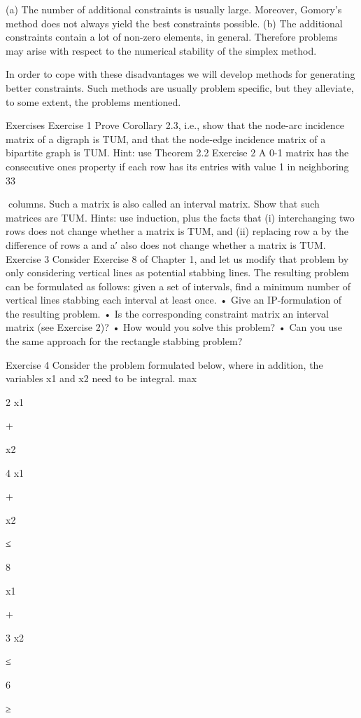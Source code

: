 \documentclass[titlepage]{book}
\theoremstyle{definition}
\begin{document}
(a) The number of additional constraints is usually large. Moreover, Gomory's method does not always
yield the best constraints possible.
(b) The additional constraints contain a lot of non-zero elements, in general. Therefore problems may
arise with respect to the numerical stability of the simplex method.

In order to cope with these disadvantages we will develop methods for generating better constraints. Such
methods are usually problem specific, but they alleviate, to some extent, the problems mentioned.

Exercises
Exercise 1
Prove Corollary 2.3, i.e., show that the node-arc incidence matrix of a digraph is TUM, and that the
node-edge incidence matrix of a bipartite graph is TUM. Hint: use Theorem 2.2
Exercise 2
A 0-1 matrix has the consecutive ones property if each row has its entries with value 1 in neighboring
33

columns. Such a matrix is also called an interval matrix. Show that such matrices are TUM. Hints: use
induction, plus the facts that (i) interchanging two rows does not change whether a matrix is TUM, and
(ii) replacing row a by the difference of rows a and a′ also does not change whether a matrix is TUM.
Exercise 3
Consider Exercise 8 of Chapter 1, and let us modify that problem by only considering vertical lines as
potential stabbing lines. The resulting problem can be formulated as follows: given a set of intervals,
find a minimum number of vertical lines stabbing each interval at least once.
• Give an IP-formulation of the resulting problem.
• Is the corresponding constraint matrix an interval matrix (see Exercise 2)?
• How would you solve this problem?
• Can you use the same approach for the rectangle stabbing problem?

Exercise 4
Consider the problem formulated below, where in addition, the variables x1 and x2 need to be integral.
max

2 x1

+

x2

4 x1

+

x2

≤

8

x1

+

3 x2

≤

6

≥
\end{document}
